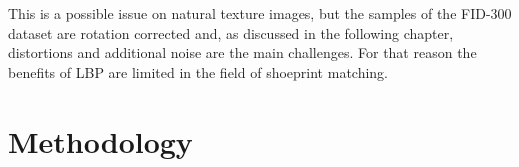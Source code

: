 \documentclass[draft,final]{vutinfth} %
\begin{document}
This is a possible issue on natural texture images, but the samples of the FID-300 dataset are rotation corrected and, as discussed in the following chapter, distortions and additional noise are the main challenges.
For that reason the benefits of LBP are limited in the field of shoeprint matching.
 


\chapter{Methodology}
\end{document}
